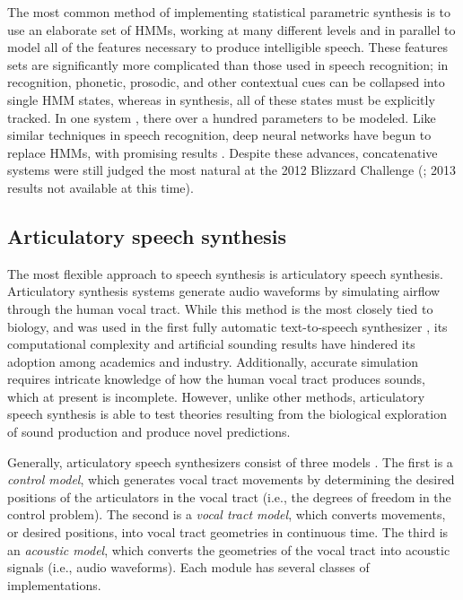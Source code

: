 \documentclass{article}
\begin{document}
The most common method of implementing
statistical parametric synthesis
is to use an elaborate set of HMMs,
working at many different levels
and in parallel to model
all of the features necessary to produce
intelligible speech.
These features sets are significantly
more complicated than those
used in speech recognition;
in recognition, phonetic, prosodic,
and other contextual cues
can be collapsed into single HMM states,
whereas in synthesis,
all of these states must be explicitly tracked.
In one system \citep{zen2007},
there over a hundred parameters to be modeled.
Like similar techniques in speech recognition,
deep neural networks have begun
to replace HMMs, with promising results
\citep{zen2013}.
Despite these advances, concatenative systems
were still judged the most natural
at the 2012 Blizzard Challenge
(\citealp{kinga2012};
2013 results not available at this time).

\subsection{Articulatory speech synthesis}
\label{subsec:articulatory}

The most flexible approach to speech synthesis
is articulatory speech synthesis.
Articulatory synthesis systems generate
audio waveforms by simulating
airflow through the human vocal tract.
While this method is
the most closely tied to biology,
and was used in the first fully automatic
text-to-speech synthesizer \citep{klatt1987},
its computational complexity
and artificial sounding results
have hindered its adoption
among academics and industry.
Additionally, accurate simulation
requires intricate knowledge
of how the human vocal tract
produces sounds,
which at present is incomplete.
However, unlike other methods,
articulatory speech synthesis
is able to test theories
resulting from the biological exploration
of sound production
and produce novel predictions.

Generally, articulatory speech synthesizers
consist of three models
\citep{kroger2009}.
The first is a \textit{control model},
which generates vocal tract movements
by determining the desired positions
of the articulators in the vocal tract
(i.e., the degrees of freedom in the control problem).
The second is a \textit{vocal tract model},
which converts movements, or desired positions,
into vocal tract geometries in continuous time.
The third is an \textit{acoustic model},
which converts the geometries of the vocal tract
into acoustic signals (i.e., audio waveforms).
Each module has several classes of implementations.
\end{document}
